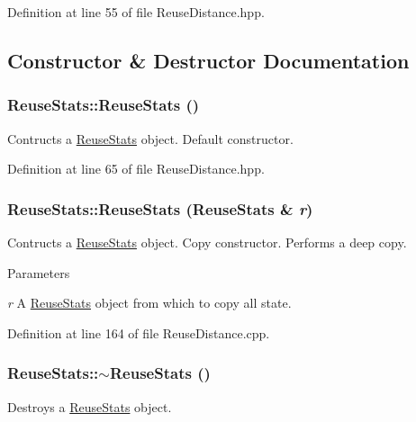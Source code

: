 Definition at line 55 of file ReuseDistance.hpp.



\subsection{Constructor \& Destructor Documentation}
\hypertarget{class_reuse_stats_a0106660db234ec0ea484c61cb18702e8}{
\subsubsection[{ReuseStats}]{\setlength{\rightskip}{0pt plus 5cm}ReuseStats::ReuseStats ()}}
\label{class_reuse_stats_a0106660db234ec0ea484c61cb18702e8}
Contructs a \hyperlink{class_reuse_stats}{ReuseStats} object. Default constructor. 

Definition at line 65 of file ReuseDistance.hpp.

\hypertarget{class_reuse_stats_a5c7df5f020e0f87e78b8f49c5624c823}{
\subsubsection[{ReuseStats}]{\setlength{\rightskip}{0pt plus 5cm}ReuseStats::ReuseStats ({\bf ReuseStats} \& {\em r})}}
\label{class_reuse_stats_a5c7df5f020e0f87e78b8f49c5624c823}
Contructs a \hyperlink{class_reuse_stats}{ReuseStats} object. Copy constructor. Performs a deep copy.


\begin{DoxyParams}{Parameters}
\item[{\em r}]A \hyperlink{class_reuse_stats}{ReuseStats} object from which to copy all state. \end{DoxyParams}


Definition at line 164 of file ReuseDistance.cpp.

\hypertarget{class_reuse_stats_a21f8a5cab3976edba08c2562c3ed8d45}{
\subsubsection[{$\sim$ReuseStats}]{\setlength{\rightskip}{0pt plus 5cm}ReuseStats::$\sim$ReuseStats ()}}
\label{class_reuse_stats_a21f8a5cab3976edba08c2562c3ed8d45}
Destroys a \hyperlink{class_reuse_stats}{ReuseStats} object. 

